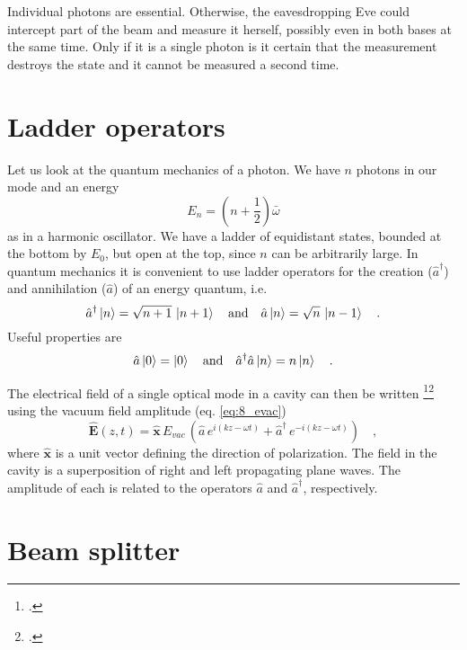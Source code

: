Individual photons are essential. Otherwise, the eavesdropping Eve could intercept part of the beam and measure it herself, possibly even in both bases at the same time. Only if it is a single photon is it certain that the measurement destroys the state and it cannot be measured a second time.



\section{Ladder operators}


Let us look at the quantum mechanics of a photon. We have $n$ photons in our mode and an energy
\begin{equation}
    E_n = \left( n + \frac{1}{2} \right) \bar \omega
\end{equation}
as in a harmonic oscillator. We have a ladder of equidistant states, bounded at the bottom by $E_0$, but open at the top, since $n$ can be arbitrarily large. In quantum mechanics it is convenient to use ladder operators for the creation ($\hat{a}^\dagger$) and annihilation ($\hat{a}$) of an energy quantum, i.e.
\begin{equation}
 \hat{a}^\dagger \ket{n} = \sqrt{n+1}\, \ket{n+1}  \quad \text{and} \quad
  \hat{a} \ket{n} = \sqrt{n}\, \ket{n-1} \quad .
\end{equation}
Useful properties are 
\begin{equation}
 \hat{a} \ket{0} = \ket{0}  \quad \text{and} \quad
  \hat{a}^\dagger  \hat{a} \ket{n} = n \ket{n} \quad .
\end{equation}


The electrical field of a single optical mode in a cavity can then be written \footcite[chap. 2.1 and 2.4]{Gerry_Knight_QO}\footcite[chap. 6.1]{Rand2016} using the vacuum field amplitude (eq. \ref{eq:8_evac})
\begin{equation}
\hat{\boldsymbol{E}}(z,t) = \boldsymbol{\hat{x}} \, E_{vac} \, \left(\hat{a} \, e^{i (k z - \omega t)} + \hat{a}^\dagger   \, e^{-i (k z - \omega t)} \right) 
\quad ,
\end{equation}
where $\boldsymbol{\hat{x}}$ is a unit vector defining the direction of polarization. The field in the cavity is a superposition of right and left propagating plane waves. The amplitude of each is related to the operators $\hat{a}$ and $\hat{a}^\dagger$, respectively.


\section{Beam splitter}

